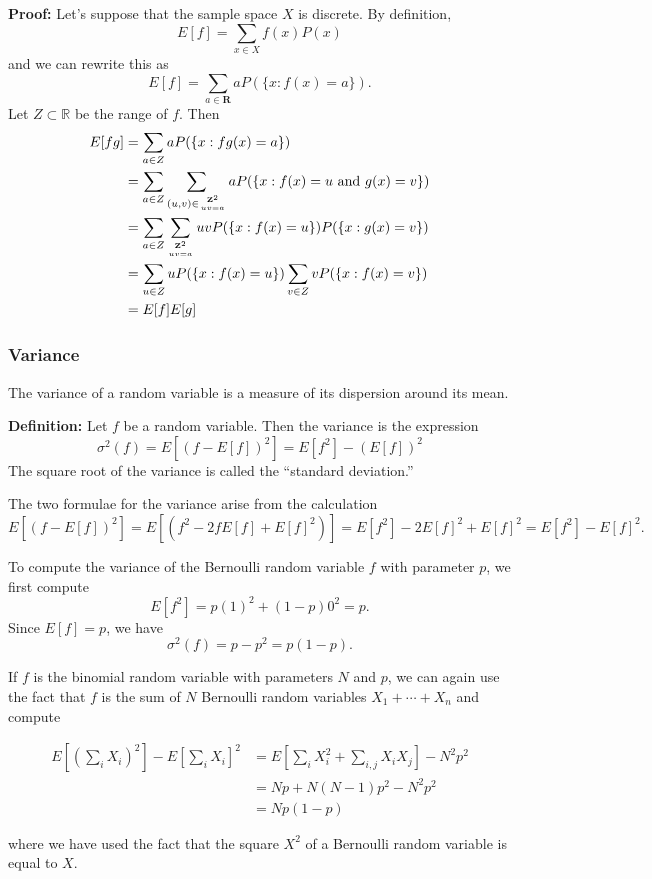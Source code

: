 \documentclass[
  oneside]{scrbook}
\renewcommand{\rm}{}
\begin{document}
\textbf{Proof:} Let's suppose that the sample space \(X\) is discrete.
By definition, \[
E[f]=\sum_{x\in X}f(x)P(x)
\] and we can rewrite this as \[
E[f]=\sum_{a\in\mathbf{R}} aP(\{x: f(x)=a\}).
\] Let \(Z\subset\mathbb{R}\) be the range of \(f\). Then \begin{align*}
E[fg]&=\sum_{a\in Z} aP(\{x: fg(x)=a\}) \\
&=\sum_{a\in Z}\sum_{(u,v)\in\genfrac{}{}{0pt}{}{\mathbf{Z}^{2}}{uv=a}}aP(\{x:f(x)=u\hbox{\rm\ and\ }g(x)=v\}) \\
&=\sum_{a\in Z}\sum_{\genfrac{}{}{0pt}{}{\mathbf{Z}^{2}}{uv=a}}uvP(\{x:f(x)=u\})P(\{x:g(x)=v\}) \\
&=\sum_{u\in Z}uP(\{x:f(x)=u\})\sum_{v\in Z}vP(\{x:f(x)=v\}) \\
&=E[f]E[g] 
\end{align*}

\hypertarget{variance-1}{%
\subsubsection{Variance}\label{variance-1}}

The variance of a random variable is a measure of its dispersion around
its mean.

\textbf{Definition:} Let \(f\) be a random variable. Then the variance
is the expression \[
\sigma^2(f) = E[(f-E[f])^2]=E[f^2]-(E[f])^2
\] The square root of the variance is called the ``standard deviation.''

The two formulae for the variance arise from the calculation \[
E[(f-E[f])^2]=E[(f^2-2fE[f]+E[f]^2)]=E[f^2]-2E[f]^2+E[f]^2=E[f^2]-E[f]^2.
\]

To compute the variance of the Bernoulli random variable \(f\) with
parameter \(p\), we first compute \[
E[f^2]=p(1)^2+(1-p)0^2=p.
\] Since \(E[f]=p\), we have \[
\sigma^2(f)=p-p^2=p(1-p).
\]

If \(f\) is the binomial random variable with parameters \(N\) and
\(p\), we can again use the fact that \(f\) is the sum of \(N\)
Bernoulli random variables \(X_1+\cdots+X_n\) and compute

\begin{align*}
E[(\sum_{i}X_i)^2]-E[\sum_{i} X_{i}]^2 &=E[\sum_{i} X_i^2+\sum_{i,j}X_{i}X_{j}]-N^2p^2\\
&=Np+N(N-1)p^2-N^2p^2 \\
&=Np(1-p)
\end{align*}

where we have used the fact that the square \(X^2\) of a Bernoulli
random variable is equal to \(X\).
\end{document}
